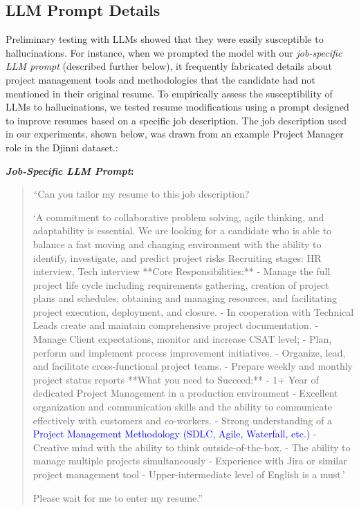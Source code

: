    \subsection{LLM Prompt Details}
    Preliminary testing with LLMs showed that they were easily susceptible to hallucinations. For instance, when we prompted the model with our \textit{job-specific LLM prompt} (described further below), it frequently fabricated details about project management tools and methodologies that the candidate had not mentioned in their original resume.
    \linebreak
    To empirically assess the susceptibility of LLMs to hallucinations, we tested resume modifications using a prompt designed to improve resumes based on a specific job description. The job description used in our experiments, shown below, was drawn from an example Project Manager role in the Djinni dataset.\citep{drushchak-romanyshyn-2024-introducing}:


        \textbf{\textit{Job-Specific LLM Prompt}:}
        \begin{quote}
            ``Can you tailor my resume to this job description? 
            
            `A commitment to collaborative problem solving, agile thinking, and adaptability is essential. We are looking for a candidate who is able to balance a fast moving and changing environment with the ability to identify, investigate, and predict project risks Recruiting stages: HR interview, Tech interview **Core Responsibilities:** - Manage the full project life cycle including requirements gathering, creation of project plans and schedules, obtaining and managing resources, and facilitating project execution, deployment, and closure. - In cooperation with Technical Leads create and maintain comprehensive project documentation. - Manage Client expectations, monitor and increase CSAT level; - Plan, perform and implement process improvement initiatives. - Organize, lead, and facilitate cross-functional project teams. - Prepare weekly and monthly project status reports **What you need to Succeed:** - 1+ Year of dedicated Project Management in a production environment - Excellent organization and communication skills and the ability to communicate effectively with customers and co-workers. - Strong understanding of a \textcolor{blue}{Project Management Methodology (SDLC, Agile, Waterfall, etc.)} - Creative mind with the ability to think outside-of-the-box. - The ability to manage multiple projects simultaneously - Experience with Jira or similar project management tool - Upper-intermediate level of English is a must.' 
            
            Please wait for me to enter my resume.''
        \end{quote}

